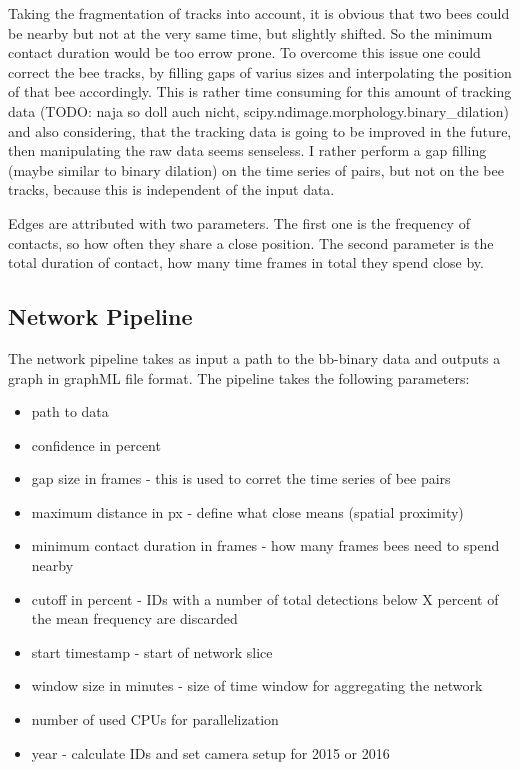 Taking the fragmentation of tracks into account, it is obvious that two bees could be nearby but not at the very same time, but slightly shifted. So the minimum contact duration would be too errow prone. To overcome this issue one could correct the bee tracks, by filling gaps of varius sizes and interpolating the position of that bee accordingly. This is rather time consuming for this amount of tracking data (TODO: naja so doll auch nicht, scipy.ndimage.morphology.binary\_dilation) and also considering, that the tracking data is going to be improved in the future, then manipulating the raw data seems senseless. I rather perform a gap filling (maybe similar to binary dilation) on the time series of pairs, but not on the bee tracks, because this is independent of the input data.

Edges are attributed with two parameters. The first one is the frequency of contacts, so how often they share a close position. The second parameter is the total duration of contact, how many time frames in total they spend close by.

\subsection{Network Pipeline}

The network pipeline takes as input a path to the bb-binary data and outputs a graph in graphML file format. The pipeline takes the following parameters:

\begin{itemize}
\item path to data
\item confidence in percent
\item gap size in frames - this is used to corret the time series of bee pairs
\item maximum distance in px - define what close means (spatial proximity)
\item minimum contact duration in frames - how many frames bees need to spend nearby
\item cutoff in percent - IDs with a number of total detections below X percent of the mean frequency are discarded 
\item start timestamp - start of network slice
\item window size in minutes - size of time window for aggregating the network
\item number of used CPUs for parallelization
\item year - calculate IDs and set camera setup for 2015 or 2016
\end{itemize}

